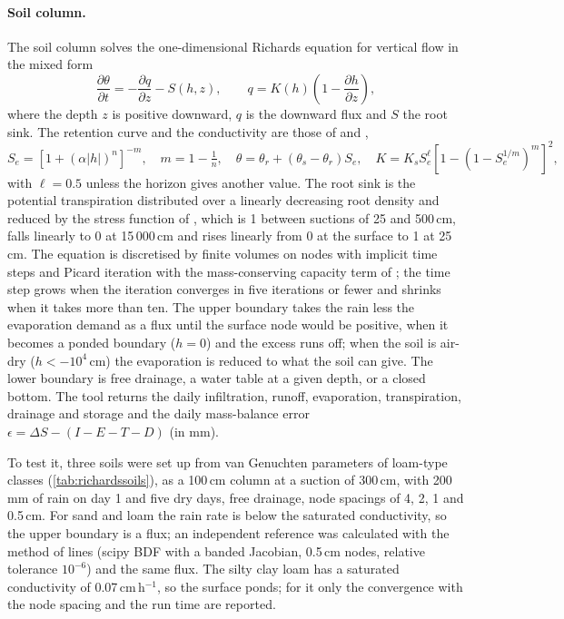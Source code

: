 \documentclass[preprint,12pt]{elsarticle}
\begin{document}
\paragraph{Soil column.}
The soil column solves the one-dimensional Richards equation for vertical flow in the mixed form
\begin{equation}\label{eq:richards}
\frac{\partial\theta}{\partial t}=-\frac{\partial q}{\partial z}-S(h,z),\qquad q=K(h)\left(1-\frac{\partial h}{\partial z}\right),
\end{equation}
where the depth $z$ is positive downward, $q$ is the downward flux and $S$ the root sink. The retention curve and the conductivity are those of \cite{vanGenuchten1980} and \cite{Mualem1976},
\begin{equation}\label{eq:vgm}
S_e=\left[1+(\alpha|h|)^n\right]^{-m},\quad m=1-\tfrac1n,\quad \theta=\theta_r+(\theta_s-\theta_r)S_e,\quad K=K_sS_e^{\ell}\left[1-\left(1-S_e^{1/m}\right)^m\right]^2,
\end{equation}
with $\ell=0.5$ unless the horizon gives another value. The root sink is the potential transpiration distributed over a linearly decreasing root density and reduced by the stress function of \cite{Feddes1978}, which is 1 between suctions of 25 and 500\,cm, falls linearly to 0 at 15\,000\,cm and rises linearly from 0 at the surface to 1 at 25\,cm. The equation is discretised by finite volumes on nodes with implicit time steps and Picard iteration with the mass-conserving capacity term of \cite{Celia1990}; the time step grows when the iteration converges in five iterations or fewer and shrinks when it takes more than ten. The upper boundary takes the rain less the evaporation demand as a flux until the surface node would be positive, when it becomes a ponded boundary ($h=0$) and the excess runs off; when the soil is air-dry ($h<-10^4$\,cm) the evaporation is reduced to what the soil can give. The lower boundary is free drainage, a water table at a given depth, or a closed bottom. The tool returns the daily infiltration, runoff, evaporation, transpiration, drainage and storage and the daily mass-balance error $\epsilon=\Delta S-(I-E-T-D)$ (in mm).

To test it, three soils were set up from van Genuchten parameters of loam-type classes (\cref{tab:richardssoils}), as a 100\,cm column at a suction of 300\,cm, with 200\,mm of rain on day 1 and five dry days, free drainage, node spacings of 4, 2, 1 and 0.5\,cm. For sand and loam the rain rate is below the saturated conductivity, so the upper boundary is a flux; an independent reference was calculated with the method of lines (scipy BDF with a banded Jacobian, 0.5\,cm nodes, relative tolerance $10^{-6}$) and the same flux. The silty clay loam has a saturated conductivity of 0.07\,cm\,h$^{-1}$, so the surface ponds; for it only the convergence with the node spacing and the run time are reported.
\end{document}

